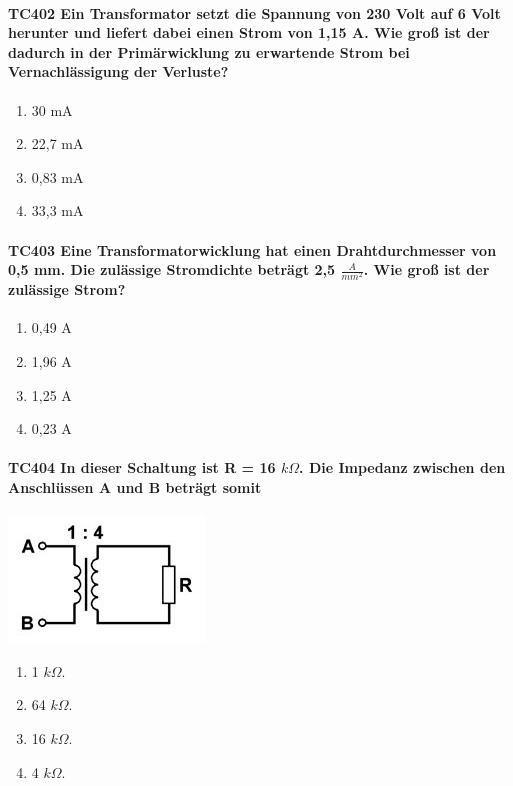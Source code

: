 \documentclass[8pt]{article}
\begin{document}
\begin{enumerate}
\begin{enumerate}[nolistsep,label=\Alph*]
{\paragraph*{TC402 Ein Transformator setzt die Spannung von 230 Volt auf 6 Volt herunter und liefert dabei einen Strom von 1,15 A. Wie groß ist der dadurch in der Primärwicklung zu erwartende Strom bei Vernachlässigung der Verluste?}
\begin{enumerate}[nolistsep,label=\Alph*]
\item 30 mA
\item 22,7 mA
\item 0,83 mA
\item 33,3 mA
\end{enumerate}

\paragraph*{TC403 Eine Transformatorwicklung hat einen Drahtdurchmesser von 0,5 mm. Die zulässige Stromdichte beträgt 2,5 $\frac{A}{mm^{2}}$. Wie groß ist der zulässige Strom?}
\begin{enumerate}[nolistsep,label=\Alph*]
\item 0,49 A
\item 1,96 A
\item 1,25 A
\item 0,23 A
\end{enumerate}

\paragraph*{TC404 In dieser Schaltung ist R = 16 $k\Omega$. Die Impedanz zwischen den Anschlüssen A und B beträgt somit}
\begin{center}
	\begin{minipage}{\linewidth}
		\centering
		\includegraphics[scale=1.0]{pics/tc404_a.jpg}
	\end{minipage}
\end{center}
\begin{enumerate}[nolistsep,label=\Alph*]
\item 1 $k\Omega$.
\item 64 $k\Omega$.
\item 16 $k\Omega$.
\item 4 $k\Omega$.
\end{enumerate}

}
\end{enumerate}
\end{enumerate}
\end{document}
